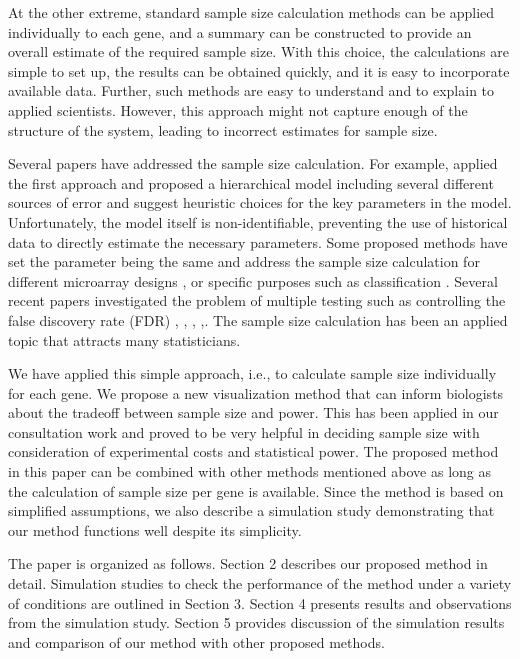 \documentclass[12pt]{article}
\begin{document}
At the other extreme, standard sample size calculation methods can
be applied individually to each gene, and a summary can be
constructed to provide an overall estimate of the required sample
size.  With this choice, the calculations are simple to set up,
the results can be obtained quickly, and it is easy to incorporate
available data. Further, such methods are easy to understand and
to explain to applied scientists.  However, this approach might
not capture enough of the structure of the system, leading to
incorrect estimates for sample size.

Several papers have addressed the sample size calculation.  For
example, \citep{Zien03} applied the first approach and proposed a
hierarchical model including several different sources of error
and suggest heuristic choices for the key parameters in the model.
Unfortunately, the model itself is non-identifiable, preventing
the use of historical data to directly estimate the necessary
parameters.  Some proposed methods have set the parameter being
the same and address the sample size calculation for different
microarray designs \citep{Lee02}, \citep{Dobbin05} or specific
purposes such as classification \citep{Hua05}.  Several recent
papers investigated the problem of multiple testing such as
controlling the false discovery rate (FDR) \citep{Liu05},
\citep{Yang03}, \citep{Pawitan05}, \citep{Jung05},\citep{Hu05}.
The sample size calculation has been an applied topic that
attracts many statisticians.

We have applied this simple approach, i.e., to calculate sample
size individually for each gene.  We propose a new visualization
method that can inform biologists about the tradeoff between
sample size and power.  This has been applied in our consultation
work and proved to be very helpful in deciding sample size with
consideration of experimental costs and statistical power.  The
proposed method in this paper can be combined with other methods
mentioned above as long as the calculation of sample size per gene
is available.  Since the method is based on simplified
assumptions, we also describe a simulation study demonstrating
that our method functions well despite its simplicity.

The paper is organized as follows. Section 2 describes our proposed
method in detail. Simulation studies to check the performance of the
method under a variety of conditions are outlined in Section 3.
Section 4 presents results and observations from the simulation
study.  Section 5 provides discussion of the simulation results and
comparison of our method with other proposed methods.
\end{document}

